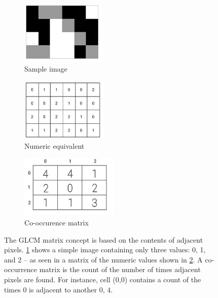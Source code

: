 \documentclass[letterpaper]{report}
\begin{document}
\begin{figure}[H]
	\begin{subfigure}[h]{0.28\linewidth}
		\includegraphics[height=3cm]{./figures/glcm-example.jpg}
		\caption{Sample image}
		\label{subfig:glcm_sample}	
	\end{subfigure}
	\hfill
	\begin{subfigure}[h]{0.28\linewidth}
		\includegraphics[height=3cm]{./figures/glcm-numeric.jpg}
		\caption{Numeric equivalent}
		\label{subfig:glcm_numeric}		
	\end{subfigure}
	\hfill
	\begin{subfigure}[h]{0.28\linewidth}
		\includegraphics[height=3cm]{./figures/glcm-matrix.jpg}
		\caption{Co-occurence matrix}
		\label{subfig:glcm_matrix}		
	\end{subfigure}%
	\hfill
	\caption[GLCM matrix explained]{The GLCM matrix concept is based on the contents of adjacent pixels. \ref{subfig:glcm_sample} shows a simple image containing only three values: 0, 1, and 2 -- as seen in a matrix of the numeric values shown in \ref{subfig:glcm_numeric}. A co-occurrence matrix is the count of the number of times adjacent pixels are found.  For instance, cell (0,0) contains a count of the times $0$ is adjacent to another $0$, $4$.}
	\label{fig:glcm-explained}
\end{figure}
\end{document}
